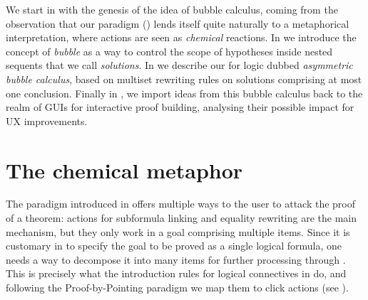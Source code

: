 We start in  with the genesis of the idea of bubble calculus,
coming from the observation that our  paradigm ()
lends itself quite naturally to a metaphorical interpretation, where actions are
seen as \emph{chemical} reactions. In  we introduce the concept
of \emph{bubble} as a way to control the scope of hypotheses inside nested
sequents that we call \emph{solutions}. In  we describe our
 for  logic dubbed \emph{asymmetric bubble calculus},
based on multiset rewriting rules on solutions comprising at most one
conclusion. Finally in , we import ideas from this bubble
calculus back to the realm of GUIs for interactive proof building, analysing
their possible impact for UX improvements.


\section{The chemical metaphor}

The  paradigm introduced in  offers multiple ways to
the user to attack the proof of a theorem:  actions for subformula linking
and equality rewriting are the main mechanism, but they only work in a goal
comprising multiple items. Since it is customary in  to specify
the goal to be proved as a single logical formula, one needs a way to decompose
it into many items for further processing through . This is precisely what
the introduction rules for logical connectives in  do, and
following the Proof-by-Pointing paradigm \cite{PbP} we map them to click
actions (see ).

